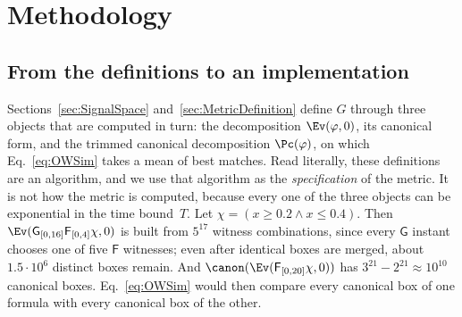 \section{Methodology}\label{sec:method}

\subsection{From the definitions to an implementation}\label{sec:method-overview}

Sections~\ref{sec:SignalSpace} and~\ref{sec:MetricDefinition} define $G$ through three objects that are computed in turn:
the decomposition $\Ev(\varphi,0)$, its canonical form, and the trimmed
canonical decomposition $\Pc(\varphi)$, on which Eq.~\eqref{eq:OWSim} takes a
mean of best matches. Read literally, these definitions are an algorithm, and
we use that algorithm as the \emph{specification} of the metric. It is not how
the metric is computed, because every one of the three objects can be
exponential in the time bound~$T$. Let $\chi = (x \ge 0.2 \wedge x \le 0.4)$.
Then $\Ev(\mathsf{G}_{[0,16]}\mathsf{F}_{[0,4]}\chi, 0)$ is built from $5^{17}$
witness combinations, since every $\mathsf{G}$ instant chooses one of five
$\mathsf{F}$ witnesses; even after identical boxes are merged, about
$1.5\cdot10^{6}$ distinct boxes remain. And
$\canon(\Ev(\mathsf{F}_{[0,20]}\chi,0))$ has $3^{21}-2^{21} \approx 10^{10}$
canonical boxes. Eq.~\eqref{eq:OWSim} would then compare every canonical box of
one formula with every canonical box of the other.

